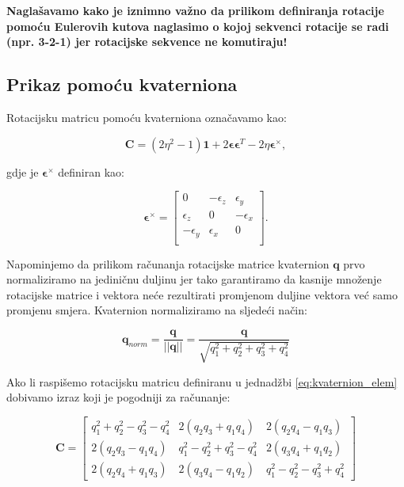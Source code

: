 \documentclass[times, utf8, diplomski, numeric]{templates/template}
\begin{document}
{{{            \textbf{Naglašavamo kako je iznimno važno da prilikom definiranja rotacije pomoću Eulerovih kutova naglasimo o kojoj sekvenci rotacije se radi (npr. 3-2-1) jer rotacijske sekvence ne komutiraju!}
        }

        \subsection{Prikaz pomoću kvaterniona}{
            Rotacijsku matricu pomoću kvaterniona označavamo kao:

            \begin{equation}
                \boldsymbol{C} = (2\eta^2-1)\boldsymbol{1} + 2\boldsymbol\epsilon\boldsymbol\epsilon^{T}-2\eta\boldsymbol\epsilon^{\times},
            \label{eq:quat_rot_matrix}
            \end{equation}

            gdje je $\boldsymbol\epsilon^{\times}$ definiran kao:

            \begin{equation}
                \boldsymbol\epsilon^{\times} =
                \begin{bmatrix}
                    0 & -\epsilon_{z} & \epsilon_{y} \\
                    \epsilon_{z} & 0 & -\epsilon_{x} \\
                    -\epsilon_{y} & \epsilon_{x} & 0 \\
                \end{bmatrix}
                .
            \end{equation}

            Napominjemo da prilikom računanja rotacijske matrice kvaternion $\boldsymbol{q}$ prvo normaliziramo na jediničnu duljinu jer tako garantiramo da kasnije množenje rotacijske matrice i vektora neće rezultirati promjenom duljine vektora već samo promjenu smjera. Kvaternion normaliziramo na sljedeći način:

            \begin{equation}
                \boldsymbol{q}_{norm} = \frac{\boldsymbol{q}}{||\boldsymbol{q}||} = \frac{\boldsymbol{q}}{\sqrt{q_1^2 + q_2^2 + q_3^2 + q_4^2}}
            \end{equation}

            Ako li raspišemo rotacijsku matricu definiranu u jednadžbi \ref{eq:kvaternion_elem} dobivamo izraz \cite{uvod_u_svemirske} koji je pogodniji za računanje:

            \begin{equation}
                \boldsymbol{C} =
                \begin{bmatrix}
                    q_1^2 + q_2^2 - q_3^2 - q_4^2 & 2(q_2q_3 + q_1q_4) & 2(q_2q_4 - q_1q_3) \\
                    2(q_2q_3 - q_1q_4) & q_1^2 - q_2^2 + q_3^2 - q_4^2 & 2(q_3q_4 + q_1q_2) \\
                    2(q_2q_4 + q_1q_3) & 2(q_3q_4 - q_1q_2) & q_1^2 - q_2^2 - q_3^2 + q_4^2 
                \end{bmatrix}
            \label{eq:rot_mat_quat}
            \end{equation}

}}}
\end{document}
